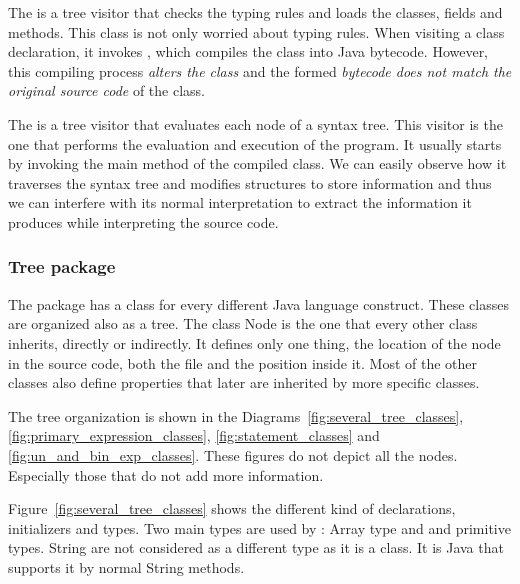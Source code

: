 The  is a tree visitor that checks the typing rules and loads the
classes, fields and methods. This  class is not only worried
about typing rules. When visiting a class declaration, it invokes
, which compiles the class into Java bytecode. However, this
compiling process \textit{alters the class} and the formed \textit{bytecode
does not match the original source code} of the class.

The  is a tree visitor that evaluates each node of
a syntax tree. This visitor is the one that performs the evaluation and
execution of the program. It usually starts by invoking the main method
of the compiled class. We can easily observe how it traverses
the syntax tree and modifies \djava{} structures to store information
and thus we can interfere with its normal interpretation to extract
the information it produces while interpreting the source code.

\subsubsection{Tree package}
\label{sec:Tree_package}

The  package has a class for every different Java language
construct. These classes are organized also as a tree. The class
Node is the one that every other class inherits, directly or
indirectly. It defines only one thing, the location of the node in
the source code, both the file and the position inside it. Most of
the other classes also define properties that later are inherited
by more specific classes.

The tree organization is shown in the
Diagrams~\ref{fig:several_tree_classes},
\ref{fig:primary_expression_classes}, \ref{fig:statement_classes}
and \ref{fig:un_and_bin_exp_classes}. These figures do not depict
all the nodes. Especially those that do not add more information.

Figure~\ref{fig:several_tree_classes} shows the different kind of
declarations, initializers and types. Two main types are used by
\djava{}: Array type and and primitive types. String are not
considered as a different type as it is a class. It is Java that
supports it by normal String methods.

